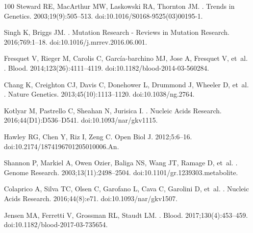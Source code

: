 \documentclass[10pt,letterpaper]{article}
\begin{document}
\begin{thebibliography}{100}
Steward RE, MacArthur MW, Laskowski RA, Thornton JM.
.
\newblock Trends in Genetics. 2003;19(9):505--513.
\newblock doi:{10.1016/S0168-9525(03)00195-1}.

Singh K, Briggs JM.
.
\newblock Mutation Research - Reviews in Mutation Research. 2016;769:1--18.
\newblock doi:{10.1016/j.mrrev.2016.06.001}.

Fresquet V, Rieger M, Carolis C, Garc{\'{i}}a-barchino MJ, Jose A, Fresquet V,
  et~al.
.
\newblock Blood. 2014;123(26):4111--4119.
\newblock doi:{10.1182/blood-2014-03-560284}.

Chang K, Creighton CJ, Davis C, Donehower L, Drummond J, Wheeler D, et~al.
.
\newblock Nature Genetics. 2013;45(10):1113--1120.
\newblock doi:{10.1038/ng.2764}.

Kotlyar M, Pastrello C, Sheahan N, Jurisica I.
.
\newblock Nucleic Acids Research. 2016;44(D1):D536--D541.
\newblock doi:{10.1093/nar/gkv1115}.

Hawley RG, Chen Y, Riz I, Zeng C.
\newblock Open Biol J. 2012;5:6--16.
\newblock doi:{10.2174/1874196701205010006.An}.

Shannon P, Markiel A, {Owen Ozier}, Baliga NS, Wang JT, Ramage D, et~al.
.
\newblock Genome Research. 2003;13(11):2498--2504.
\newblock doi:{10.1101/gr.1239303.metabolite}.

Colaprico A, Silva TC, Olsen C, Garofano L, Cava C, Garolini D, et~al.
.
\newblock Nucleic Acids Research. 2016;44(8):e71.
\newblock doi:{10.1093/nar/gkv1507}.

Jensen MA, Ferretti V, Grossman RL, Staudt LM.
.
\newblock Blood. 2017;130(4):453--459.
\newblock doi:{10.1182/blood-2017-03-735654}.


\end{thebibliography}
\end{document}

